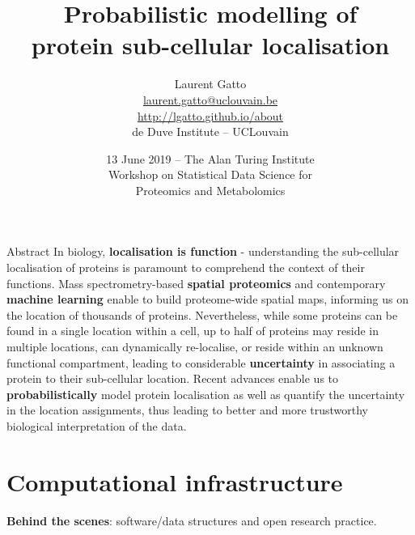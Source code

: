\documentclass[presentation]{beamer}
\date{13 June 2019 -- The Alan Turing Institute \\
  Workshop on Statistical Data Science for\\
  Proteomics and Metabolomics}
\title{Probabilistic modelling of \\ protein sub-cellular localisation}
\author{Laurent Gatto\\
  \url{laurent.gatto@uclouvain.be}\\
  \url{http://lgatto.github.io/about}\\
  de Duve Institute -- UCLouvain\\  
}
\begin{document}
\maketitle


\begin{frame}{Abstract}
  In biology, \textbf{localisation is function} - understanding the
  sub-cellular localisation of proteins is paramount to comprehend the
  context of their functions. Mass spectrometry-based \textbf{spatial
    proteomics} and contemporary \textbf{machine learning} enable to
  build proteome-wide spatial maps, informing us on the location of
  thousands of proteins. Nevertheless, while some proteins can be
  found in a single location within a cell, up to half of proteins may
  reside in multiple locations, can dynamically re-localise, or reside
  within an unknown functional compartment, leading to considerable
  \textbf{uncertainty} in associating a protein to their sub-cellular
  location. Recent advances enable us to \textbf{probabilistically}
  model protein localisation as well as quantify the uncertainty in
  the location assignments, thus leading to better and more
  trustworthy biological interpretation of the data.
\end{frame}





\section{Computational infrastructure}

\begin{frame}{}
  \begin{center}
    \Large{\textbf{Behind the scenes}: software/data structures and
      open research practice.}
  \end{center}
\end{frame}
\end{document}
